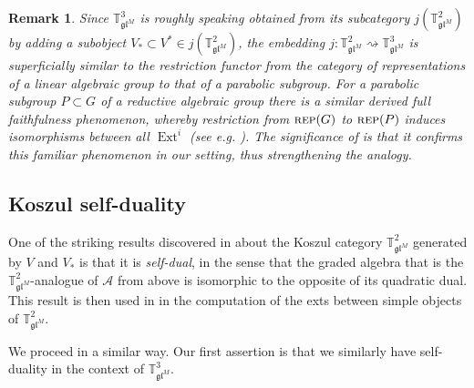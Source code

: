 \documentclass[11pt]{article}
\theoremstyle{plain}
\theoremstyle{nonumberplain}
\theoremstyle{plain}
\newtheorem{remark}[lemma]{Remark}
\theoremstyle{nonumberplain}
\newcommand\bT{{\mathbb T}}
\newcommand\cA{{\mathcal A}}
\newcommand\fgl{\mathfrak{gl}}
\DeclareMathOperator{\Ext}{\mathrm{Ext}}
\newcommand{\define}[1]{{\em #1}}
\newcommand{\cat}[1]{\textsc{#1}}
\begin{document}
\begin{remark}
Since $\bT^3_{\fgl^M}$ is roughly speaking obtained from its subcategory $j\left(\bT^2_{\fgl^M}\right)$ by adding a subobject $V_*\subset V^*\in j\left(\bT^2_{\fgl^M}\right)$, the embedding $j:\bT^2_{\fgl^M}\rightsquigarrow \bT^3_{\fgl^M}$ is superficially similar to the restriction functor from the category of representations of a linear algebraic group to that of a parabolic subgroup.  For a parabolic subgroup $P\subset G$ of a reductive algebraic group there is a similar derived full faithfulness phenomenon, whereby restriction from $\cat{rep}(G)$ to $\cat{rep}(P)$ induces isomorphisms between all $\Ext^i$ (see e.g. \cite[Corollary II.4.7]{Jan03}). The significance of  is that it confirms this familiar phenomenon in our setting, thus strengthening the analogy. 
\end{remark}




\subsection{Koszul self-duality}



One of the striking results discovered in \cite{DPS} about the Koszul category $\bT^2_{\fgl^M}$ generated by $V$ and $V_*$ is that it is \define{self-dual}, in the sense that the graded algebra that is the $\bT^2_{\fgl^M}$-analogue of $\cA$ from  above is isomorphic to the opposite of its quadratic dual. This result is then used in \cite{DPS} in the computation of the exts between simple objects of $\bT^2_{\fgl^M}$.

We proceed in a similar way. Our first assertion is that we similarly have self-duality in the context of $\bT^3_{\fgl^M}$. 
\end{document}
